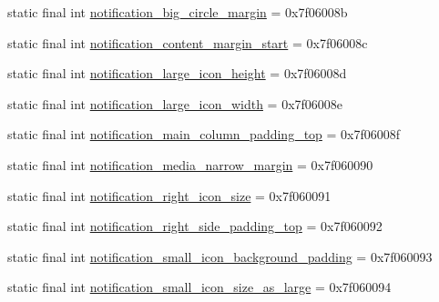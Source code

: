 \begin{DoxyCompactItemize}
\item 
static final int \mbox{\hyperlink{classandroid_1_1support_1_1graphics_1_1drawable_1_1animated_1_1_r_1_1dimen_a29843189f8be69df69dab88fc2bd0316}{notification\+\_\+big\+\_\+circle\+\_\+margin}} = 0x7f06008b
\item 
static final int \mbox{\hyperlink{classandroid_1_1support_1_1graphics_1_1drawable_1_1animated_1_1_r_1_1dimen_ab77e9e0b68ae1bdcca7c792a180808f6}{notification\+\_\+content\+\_\+margin\+\_\+start}} = 0x7f06008c
\item 
static final int \mbox{\hyperlink{classandroid_1_1support_1_1graphics_1_1drawable_1_1animated_1_1_r_1_1dimen_a425b66d703859f43139060e3ee7e742f}{notification\+\_\+large\+\_\+icon\+\_\+height}} = 0x7f06008d
\item 
static final int \mbox{\hyperlink{classandroid_1_1support_1_1graphics_1_1drawable_1_1animated_1_1_r_1_1dimen_ad1274a43256ec0e870cd00b2ef1b5523}{notification\+\_\+large\+\_\+icon\+\_\+width}} = 0x7f06008e
\item 
static final int \mbox{\hyperlink{classandroid_1_1support_1_1graphics_1_1drawable_1_1animated_1_1_r_1_1dimen_adf23202b00bba2376f07a97f7e557b81}{notification\+\_\+main\+\_\+column\+\_\+padding\+\_\+top}} = 0x7f06008f
\item 
static final int \mbox{\hyperlink{classandroid_1_1support_1_1graphics_1_1drawable_1_1animated_1_1_r_1_1dimen_af5c89f4df946fb0716e0f517ace5ebd8}{notification\+\_\+media\+\_\+narrow\+\_\+margin}} = 0x7f060090
\item 
static final int \mbox{\hyperlink{classandroid_1_1support_1_1graphics_1_1drawable_1_1animated_1_1_r_1_1dimen_a2d8fa1641c3f84e90f05a2d9b6a8a5ff}{notification\+\_\+right\+\_\+icon\+\_\+size}} = 0x7f060091
\item 
static final int \mbox{\hyperlink{classandroid_1_1support_1_1graphics_1_1drawable_1_1animated_1_1_r_1_1dimen_acfbd23fa75e671c18e3967104d05e4b7}{notification\+\_\+right\+\_\+side\+\_\+padding\+\_\+top}} = 0x7f060092
\item 
static final int \mbox{\hyperlink{classandroid_1_1support_1_1graphics_1_1drawable_1_1animated_1_1_r_1_1dimen_a13c0e7b83a691d504d0aec70da23bf52}{notification\+\_\+small\+\_\+icon\+\_\+background\+\_\+padding}} = 0x7f060093
\item 
static final int \mbox{\hyperlink{classandroid_1_1support_1_1graphics_1_1drawable_1_1animated_1_1_r_1_1dimen_a4629cadbe259ff38fca602da79471f2f}{notification\+\_\+small\+\_\+icon\+\_\+size\+\_\+as\+\_\+large}} = 0x7f060094
\item 

\end{DoxyCompactItemize}

